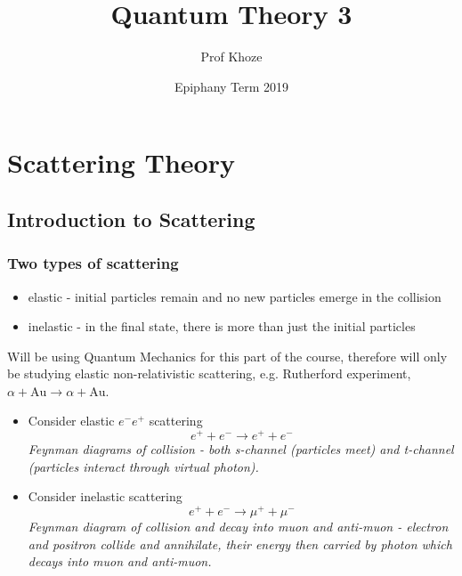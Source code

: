 \documentclass[a4paper, 11pt, normalem]{report}
\title{Quantum Theory 3 \vspace{-20pt}}
\author{Prof Khoze}
\date{\vspace{-15pt}Epiphany Term 2019}
\begin{document}
\maketitle
\tableofcontents

\part{Scattering Theory}
\chapter{Introduction to Scattering}
\section{Two types of scattering}
\begin{itemize}
    \item elastic - initial particles remain and no new particles emerge in the collision
    \item inelastic - in the final state, there is more than just the initial particles
\end{itemize}
Will be using  Quantum Mechanics for this part of the course, therefore will only be studying elastic non-relativistic scattering, e.g. Rutherford experiment, $\alpha + \text{Au} \to \alpha + \text{Au}$.
\begin{itemize}
    \item Consider elastic $e^-e^+$ scattering
        \begin{equation}
            e^+ + e^- \to e^+ + e^-
        \end{equation}
        \emph{Feynman diagrams of collision - both s-channel (particles meet) and t-channel (particles interact through virtual photon).}
    \item Consider inelastic scattering
        \begin{equation}
            e^+ + e^- \to \mu^+ + \mu^-
        \end{equation}
        \emph{Feynman diagram of collision and decay into muon and anti-muon - electron and positron collide and annihilate, their energy then carried by photon which decays into muon and anti-muon.}
\end{itemize}
\end{document}
